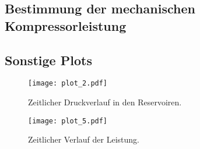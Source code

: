 \subsection{Bestimmung der mechanischen Kompressorleistung}


\subsection{Sonstige Plots}

\begin{figure}
  \centering
  \texttt{[image: plot\_2.pdf]}
  \caption{Zeitlicher Druckverlauf in den Reservoiren.}
  \label{fig:plot3}
\end{figure}


\begin{figure}
  \centering
  \texttt{[image: plot\_5.pdf]}
  \caption{Zeitlicher Verlauf der Leistung.}
  \label{fig:plot5}
\end{figure}
